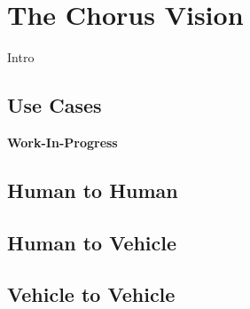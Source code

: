 \documentclass{llncs}
\begin{document}
{%


	


	\section{The Chorus Vision}
		\label{s:section-3}
		
		
		Intro


		
		\subsection{Use Cases}
			\label{ss:use-cases}

			\textbf{Work-In-Progress}
			
			\subsection{Human to Human}

			\subsection{Human to Vehicle}
		
			\subsection{Vehicle to Vehicle}
			
}
\end{document}
